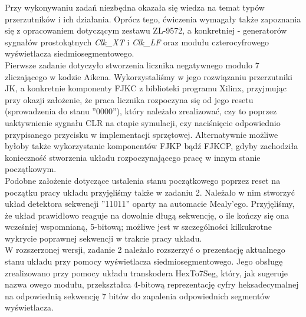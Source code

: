 \documentclass[a4paper,12pt]{extarticle}  %
\begin{document}
Przy wykonywaniu zadań niezbędna okazała się wiedza na temat typów przerzutników i ich działania. Oprócz tego, ćwiczenia wymagały także zapoznania się z opracowaniem dotyczącym zestawu ZL-9572, a konkretniej - generatorów sygnałów prostokątnych \textit{Clk\_XT} i \textit{Clk\_LF} oraz modułu czterocyfrowego wyświetlacza siedmiosegmentowego. \\
Pierwsze zadanie dotyczyło stworzenia licznika negatywnego modulo 7 zliczającego w kodzie Aikena. Wykorzystaliśmy w jego rozwiązaniu przerzutniki JK, a konkretnie komponenty FJKC z biblioteki programu Xilinx, przyjmując przy okazji założenie, że praca licznika rozpoczyna się od jego resetu (sprowadzenia do stanu ''0000''), który należało zrealizować, czy to poprzez uaktywnienie sygnału CLR na etapie symulacji, czy naciśnięcie odpowiednio przypisanego przycisku w implementacji sprzętowej. Alternatywnie możliwe byłoby także wykorzystanie komponentów FJKP bądź FJKCP, gdyby zachodziła konieczność stworzenia układu rozpoczynającego pracę w innym stanie początkowym. \\
Podobne założenie dotyczące ustalenia stanu początkowego poprzez reset na początku pracy układu przyjęliśmy także w zadaniu 2. Należało w nim stworzyć układ detektora sekwencji ''11011'' oparty na automacie Mealy'ego. Przyjęliśmy, że układ prawidłowo reaguje na dowolnie długą sekwencję, o ile kończy się ona wcześniej wspomnianą, 5-bitową; możliwe jest w szczególności kilkukrotne wykrycie poprawnej sekwencji w trakcie pracy układu. \\
W rozszerzonej wersji, zadanie 2 należało rozszerzyć o prezentację aktualnego stanu układu przy pomocy wyświetlacza siedmiosegmentowego. Jego obsługę zrealizowano przy pomocy układu transkodera HexTo7Seg, który, jak sugeruje nazwa owego modułu, przekształca 4-bitową reprezentację cyfry heksadecymalnej na odpowiednią sekwencję 7 bitów do zapalenia odpowiednich segmentów wyświetlacza.
\end{document}
